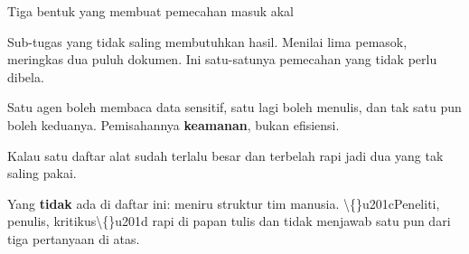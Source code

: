 \documentclass[aspectratio=169,11pt,t]{beamer}
\begin{document}
\begin{frame}[shrink=25]{Tiga bentuk yang membuat pemecahan masuk akal}
\begin{minipage}[t]{0.3253\textwidth}
\begin{icardgood}
Sub-tugas yang tidak saling membutuhkan hasil. Menilai lima pemasok, meringkas dua puluh dokumen. Ini satu-satunya pemecahan yang tidak perlu dibela.
\end{icardgood}
\end{minipage}%
\hfill
\begin{minipage}[t]{0.3253\textwidth}
\begin{icardgood}
Satu agen boleh membaca data sensitif, satu lagi boleh menulis, dan tak satu pun boleh keduanya. Pemisahannya \textbf{keamanan}, bukan efisiensi.
\end{icardgood}
\end{minipage}%
\hfill
\begin{minipage}[t]{0.3253\textwidth}
\begin{icardgood}
Kalau satu daftar alat sudah terlalu besar dan terbelah rapi jadi dua yang tak saling pakai.
\end{icardgood}
\end{minipage}%
{\fontsize{9.4}{12.6}\selectfont\color{fg2}Yang \textbf{tidak} ada di daftar ini: meniru struktur tim manusia. \textbackslash\{\}u201cPeneliti, penulis, kritikus\textbackslash\{\}u201d rapi di papan tulis dan tidak menjawab satu pun dari tiga pertanyaan di atas.\par}\vskip 4pt
\end{frame}
\end{document}
